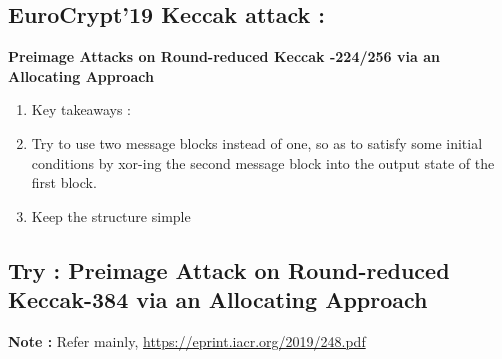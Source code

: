 \documentclass{article}
\begin{document}
\subsection{EuroCrypt'19 Keccak attack :}
\textbf{Preimage Attacks on Round-reduced Keccak -224/256 via an Allocating Approach}
\begin{enumerate}
    \item Key takeaways :
    \item Try to use two message blocks instead of one, so as to satisfy some initial conditions by xor-ing the second message block into the output state of the first block.
    \item Keep the structure simple
\end{enumerate}

\subsection{Try : Preimage Attack on Round-reduced Keccak-384 via an Allocating Approach}

\textbf{Note :} Refer mainly, \url{https://eprint.iacr.org/2019/248.pdf}
\end{document}
